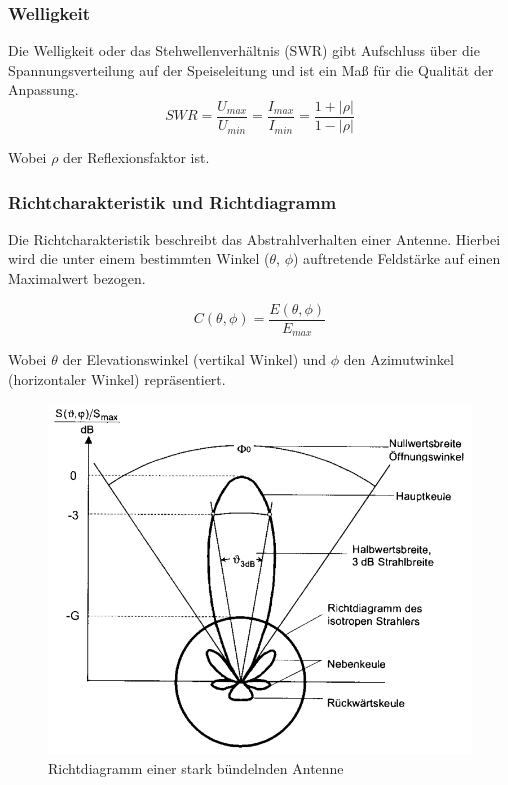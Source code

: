 \subsubsection{Welligkeit}
Die Welligkeit oder das Stehwellenverhältnis (SWR) gibt Aufschluss über die Spannungsverteilung auf der Speiseleitung und ist ein Maß für die Qualität der Anpassung.\\


\begin{equation}
	SWR=\frac{U_{max}}{U_{min}}=\frac{I_{max}}{I_{min}}=\frac{1+\lvert \rho \lvert}{1-\lvert \rho \lvert}
\end{equation}

Wobei $\rho$ der Reflexionsfaktor ist. 

\subsubsection{Richtcharakteristik und Richtdiagramm}
Die Richtcharakteristik beschreibt das Abstrahlverhalten einer Antenne. Hierbei wird die unter einem bestimmten Winkel ($\theta$, $\phi$) auftretende Feldstärke auf einen Maximalwert bezogen.

\begin{equation}
	C(\theta, \phi)=\frac{E(\theta, \phi)}{E_{max}}
\end{equation}

Wobei $\theta$ der Elevationswinkel (vertikal Winkel) und $\phi$ den Azimutwinkel (horizontaler Winkel) repräsentiert.

\begin{figure}[h]
	\centering
	\includegraphics[width=16cm]{../ref/Richtdiagramm_Beispiel}
	\caption{Richtdiagramm einer stark bündelnden Antenne}
	\label{fig:Richtdiagramm Beispiel}
\end{figure}

